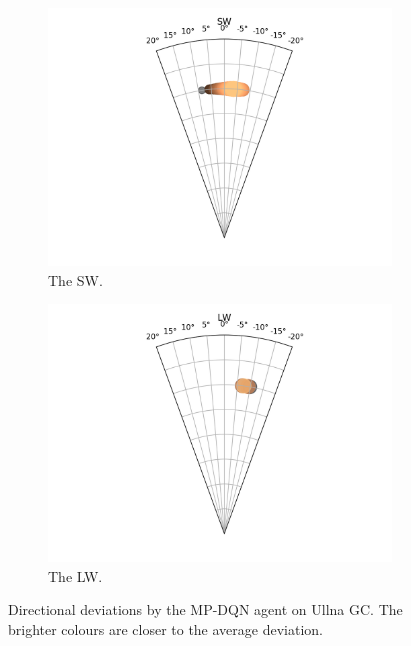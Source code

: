 \documentclass{kththesis}
\begin{document}
\begin{figure}
\begin{subfigure}{0.4\textwidth}
    \centering
    \includegraphics[width=\textwidth]{AgentDirectionChoices/MPDQN_Ullna_Direction_Choices_SW.png} 
    \caption{The SW.}
    \label{fig:SW_ullna_deviation}
    \end{subfigure}
    \begin{subfigure}{0.4\textwidth}
    \centering
    \includegraphics[width=\textwidth]{AgentDirectionChoices/MPDQN_Ullna_Direction_Choices_LW.png} 
    \caption{The LW.}
    \label{fig:LW_ullna_deviation}
    \end{subfigure}
    \caption{Directional deviations by the MP-DQN agent on Ullna GC. The brighter colours are closer to the average deviation.}
\end{figure}
\end{document}

